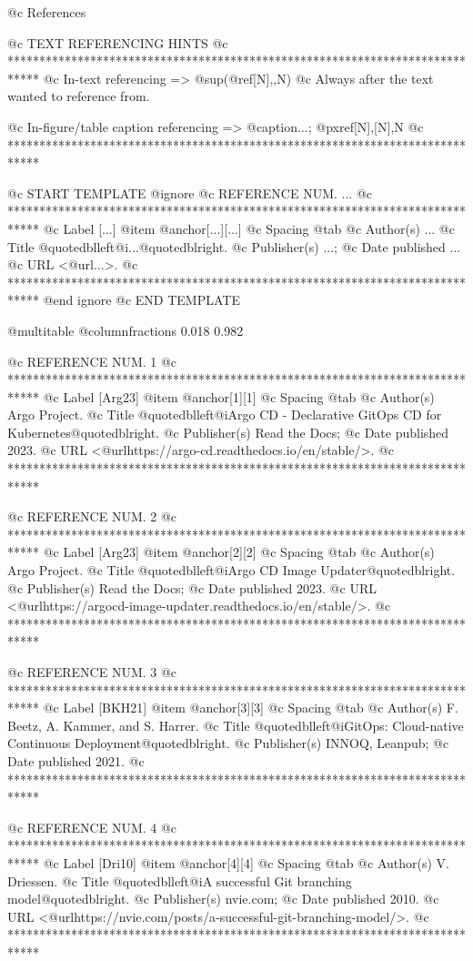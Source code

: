 @c References


@c TEXT REFERENCING HINTS
@c *****************************************************************************
@c In-text referencing => @sup{(@ref{[N],,N})}
@c Always after the text wanted to reference from.

@c In-figure/table caption referencing => @caption{...; @pxref{[N],[N],N}}
@c *****************************************************************************


@c START TEMPLATE
@ignore
@c REFERENCE NUM. ...
@c *****************************************************************************
@c Label [...]
@item @anchor{[...]}[...]
@c Spacing
@tab
@c Author(s)
...
@c Title
@quotedblleft{}@i{...}@quotedblright{}.
@c Publisher(s)
...;
@c Date published
...
@c URL
<@url{...}>.
@c *****************************************************************************
@end ignore
@c END TEMPLATE


@multitable @columnfractions 0.018 0.982

@c REFERENCE NUM. 1
@c *****************************************************************************
@c Label [Arg23]
@item @anchor{[1]}[1]
@c Spacing
@tab
@c Author(s)
Argo Project.
@c Title
@quotedblleft{}@i{Argo CD - Declarative GitOps CD for Kubernetes}@quotedblright{}.
@c Publisher(s)
Read the Docs;
@c Date published
2023.
@c URL
<@url{https://argo-cd.readthedocs.io/en/stable/}>.
@c *****************************************************************************

@c REFERENCE NUM. 2
@c *****************************************************************************
@c Label [Arg23]
@item @anchor{[2]}[2]
@c Spacing
@tab
@c Author(s)
Argo Project.
@c Title
@quotedblleft{}@i{Argo CD Image Updater}@quotedblright{}.
@c Publisher(s)
Read the Docs;
@c Date published
2023.
@c URL
<@url{https://argocd-image-updater.readthedocs.io/en/stable/}>.
@c *****************************************************************************

@c REFERENCE NUM. 3
@c *****************************************************************************
@c Label [BKH21]
@item @anchor{[3]}[3]
@c Spacing
@tab
@c Author(s)
F. Beetz, A. Kammer, and S. Harrer.
@c Title
@quotedblleft{}@i{GitOps: Cloud-native Continuous Deployment}@quotedblright{}.
@c Publisher(s)
INNOQ, Leanpub;
@c Date published
2021.
@c *****************************************************************************

@c REFERENCE NUM. 4
@c *****************************************************************************
@c Label [Dri10]
@item @anchor{[4]}[4]
@c Spacing
@tab
@c Author(s)
V. Driessen.
@c Title
@quotedblleft{}@i{A successful Git branching model}@quotedblright{}.
@c Publisher(s)
nvie.com;
@c Date published
2010.
@c URL
<@url{https://nvie.com/posts/a-successful-git-branching-model/}>.
@c *****************************************************************************

